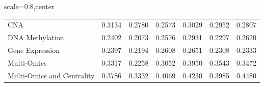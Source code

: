 \documentclass[ppgc, diss, english]{iiufrgs}
\begin{document}
\begin{landscape}
\begin{table}[!th]
\begin{adjustbox}{scale=0.8,center}
\begin{tabular}{lllllll}
CNA                        & 0.3134        & 0.2780        & 0.2573                            & 0.3029                     & 0.2952                   & 0.2807                   \\
DNA Methylation            & 0.2402        & 0.2073        & 0.2576                            & 0.2931                     & 0.2297                   & 0.2620                   \\
Gene Expression            & 0.2397        & 0.2194        & 0.2608                            & 0.2651                     & 0.2308                   & 0.2333                   \\
Multi-Omics                & 0.3317        & 0.2258        & 0.3052                            & 0.3950                     & 0.3543                   & 0.3472                   \\
Multi-Omics and Centrality & 0.3786        & 0.3332        & 0.4069                            & 0.4230                     & 0.3985                   & 0.4480                   \\ \hline
\end{tabular}

\end{adjustbox}

\end{table}
\end{landscape}
\end{document}
